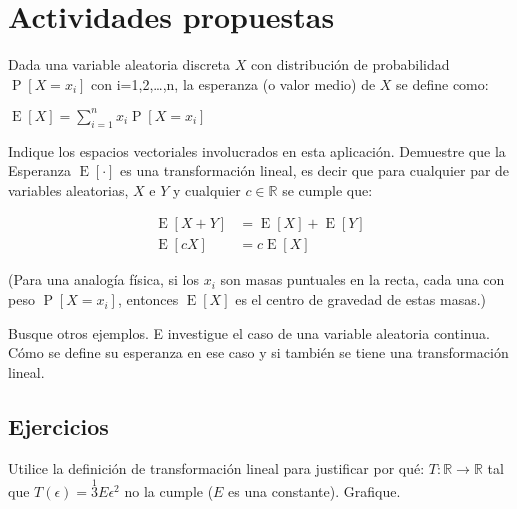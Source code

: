 \section{Actividades propuestas}
\begin{answers}
Dada una variable aleatoria discreta $X$ con distribución de probabilidad $\operatorname{P}[X=x_i]$ con i=1,2,\dots,n,  la esperanza  (o valor medio) de $X$ se define como:

\bigskip

$\operatorname{E}[X]=\sum_{i=1}^n x_i\operatorname{P}[X=x_i]$

\bigskip

\noindent Indique los espacios vectoriales involucrados en esta aplicación. Demuestre que la  Esperanza $\operatorname{E}[\cdot]$ es una transformación lineal, es decir   que para cualquier par de  variables aleatorias, $X$ e $Y$  y cualquier $c\in\mathbb{R}$ se cumple que:




\begin{align*}
    \operatorname{E}[X + Y]&=\operatorname{E}[X] + \operatorname{E}[Y] \\
    \operatorname{E}[cX]&=c\operatorname{E}[X]
\end{align*}

\noindent (Para una analogía física, si los $x_i$ son masas puntuales  en la recta, cada una con peso $\operatorname{P}[X=x_i]$, entonces $\operatorname{E}[X]$  es el centro de gravedad de estas masas.)

\noindent Busque  otros ejemplos. E investigue el caso de una variable aleatoria continua. Cómo se define su esperanza en ese caso y si también se tiene una transformación lineal. 
\end{answers}


\subsection{Ejercicios}
\begin{exercise}
\item
Utilice la definición de transformación lineal para justificar por qué: $T:\mathbb{R} \rightarrow \mathbb{R}$ tal que $T(\epsilon)=\stackrel{1}{3}E\epsilon^2$ no la cumple ($E$ es una constante). Grafique.
\end{exercise}


